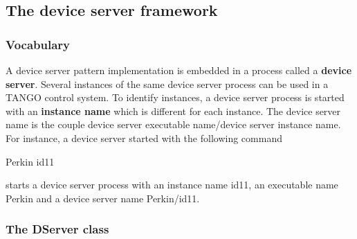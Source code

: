 \subsection{The device server framework}

\subsubsection{Vocabulary\label{Voc}}

A device server pattern implementation is embedded
in a process called a \textbf{device server}. Several instances of
the same device server process can be used in a TANGO control system.
To identify instances, a device server process is started with an
\textbf{instance name} which is different for each instance. The device
server name is the couple device server executable
name/device server instance name. For instance, a
device server started with the following command \begin{center}Perkin
id11\end{center} starts a device server process with an instance
name id11, an executable name Perkin and a device server name Perkin/id11.

\subsubsection{The DServer class\label{DServer_class}}

